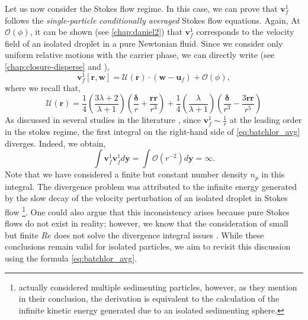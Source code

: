 Let us now consider the Stokes flow regime. 
In this case, we can prove that $\textbf{v}_f^{1}$ follows the \textit{single-particle conditionally averaged} Stokes flow equations. 
Again, At $\mathcal{O}(\phi)$, it can be shown (see \ref{chap:daniel2}) that $\textbf{v}^1_f$ corresponds to the velocity field of an isolated droplet in a pure Newtonian fluid. 
Since we consider only uniform relative motions with the carrier phase, we can directly write (see \ref{chap:closure-disperse} and \citet{kim2013microhydrodynamics}), 
\begin{equation}
    \textbf{v}_f^{1}[\textbf{r},\textbf{w}]
    = 
    \mathcal{U}(\textbf{r}) \cdot (\textbf{w} - \textbf{u}_f)
    + \mathcal{O}(\phi),
    \label{eq:stokes_sol}
\end{equation}
where we recall that,
\begin{equation}
    \mathcal{U}(\textbf{r})= 
    \frac{1}{4}\left(\frac{3\lambda + 2}{\lambda +1}\right)
    \left(\frac{\bm\delta}{r} + \frac{\textbf{rr}}{r^3}\right) 
    + 
    \frac{1}{4}\left(\frac{\lambda}{\lambda +1}\right)
    \left(\frac{\bm\delta}{r^3} - \frac{3 \textbf{rr}}{r^5}\right)
    \label{eq:Umathcal}
\end{equation}
As discussed in several studies in the literature \citep{caflisch1985variance}, 
since $\textbf{v}_f^{1} \sim \frac{1}{r}$ at the leading order in the stokes regime, the first integral on the right-hand side of \ref{eq:batchlor_avg} diverges. 
Indeed, we obtain,
\begin{equation}
    \int \textbf{v}_f^{1} \textbf{v}_f^{1}  d \textbf{y} = 
    \int \mathcal{O}(r^{-2}) d \textbf{y} = \infty.
    \label{eq:non_convergence}
\end{equation}
Note that we have considered a finite but constant number density $n_p$ in this integral. 
The divergence problem was attributed to the infinite energy generated by the slow decay of the velocity perturbation of an isolated droplet in Stokes flow \citep{caflisch1985variance}\footnote{\citet{caflisch1985variance} actually considered multiple sedimenting particles, however, as they mention in their conclusion, the derivation is equivalent to the calculation of the infinite kinetic energy generated due to an isolated sedimenting sphere. }. 
One could also argue that this inconsistency arises because pure Stokes flows do not exist in reality; however, we know that the consideration of small but finite $Re$ does not solve the divergence integral issues \citep{koch1993hydrodynamic}. 
While these conclusions remain valid for isolated particles, we aim to revisit this discussion using the formula \ref{eq:batchlor_avg}.

